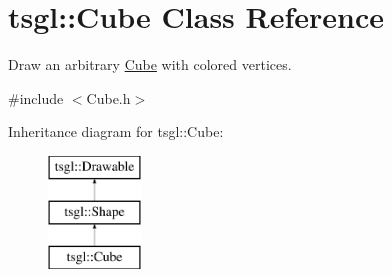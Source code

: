 \hypertarget{classtsgl_1_1_cube}{}\section{tsgl\+:\+:Cube Class Reference}
\label{classtsgl_1_1_cube}


Draw an arbitrary \hyperlink{classtsgl_1_1_cube}{Cube} with colored vertices.  




{\ttfamily \#include $<$Cube.\+h$>$}

Inheritance diagram for tsgl\+:\+:Cube\+:\begin{figure}[H]
\begin{center}
\leavevmode
\includegraphics[height=3.000000cm]{classtsgl_1_1_cube}
\end{center}
\end{figure}
